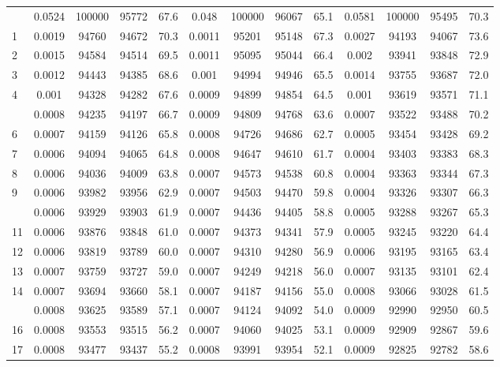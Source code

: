 \documentclass[
  14pt,
]{article}
\begin{document}
\begin{longtable}[t]{lcccccccccccc}
\endfoot
\bottomrule
\endlastfoot
0 & 0.0524 & 100000 & 95772 & 67.6 & 0.048 & 100000 & 96067 & 65.1 & 0.0581 & 100000 & 95495 & 70.3\\
1 & 0.0019 & 94760 & 94672 & 70.3 & 0.0011 & 95201 & 95148 & 67.3 & 0.0027 & 94193 & 94067 & 73.6\\
2 & 0.0015 & 94584 & 94514 & 69.5 & 0.0011 & 95095 & 95044 & 66.4 & 0.002 & 93941 & 93848 & 72.9\\
3 & 0.0012 & 94443 & 94385 & 68.6 & 0.001 & 94994 & 94946 & 65.5 & 0.0014 & 93755 & 93687 & 72.0\\
4 & 0.001 & 94328 & 94282 & 67.6 & 0.0009 & 94899 & 94854 & 64.5 & 0.001 & 93619 & 93571 & 71.1\\
\addlinespace
5 & 0.0008 & 94235 & 94197 & 66.7 & 0.0009 & 94809 & 94768 & 63.6 & 0.0007 & 93522 & 93488 & 70.2\\
6 & 0.0007 & 94159 & 94126 & 65.8 & 0.0008 & 94726 & 94686 & 62.7 & 0.0005 & 93454 & 93428 & 69.2\\
7 & 0.0006 & 94094 & 94065 & 64.8 & 0.0008 & 94647 & 94610 & 61.7 & 0.0004 & 93403 & 93383 & 68.3\\
8 & 0.0006 & 94036 & 94009 & 63.8 & 0.0007 & 94573 & 94538 & 60.8 & 0.0004 & 93363 & 93344 & 67.3\\
9 & 0.0006 & 93982 & 93956 & 62.9 & 0.0007 & 94503 & 94470 & 59.8 & 0.0004 & 93326 & 93307 & 66.3\\
\addlinespace
10 & 0.0006 & 93929 & 93903 & 61.9 & 0.0007 & 94436 & 94405 & 58.8 & 0.0005 & 93288 & 93267 & 65.3\\
11 & 0.0006 & 93876 & 93848 & 61.0 & 0.0007 & 94373 & 94341 & 57.9 & 0.0005 & 93245 & 93220 & 64.4\\
12 & 0.0006 & 93819 & 93789 & 60.0 & 0.0007 & 94310 & 94280 & 56.9 & 0.0006 & 93195 & 93165 & 63.4\\
13 & 0.0007 & 93759 & 93727 & 59.0 & 0.0007 & 94249 & 94218 & 56.0 & 0.0007 & 93135 & 93101 & 62.4\\
14 & 0.0007 & 93694 & 93660 & 58.1 & 0.0007 & 94187 & 94156 & 55.0 & 0.0008 & 93066 & 93028 & 61.5\\
\addlinespace
15 & 0.0008 & 93625 & 93589 & 57.1 & 0.0007 & 94124 & 94092 & 54.0 & 0.0009 & 92990 & 92950 & 60.5\\
16 & 0.0008 & 93553 & 93515 & 56.2 & 0.0007 & 94060 & 94025 & 53.1 & 0.0009 & 92909 & 92867 & 59.6\\
17 & 0.0008 & 93477 & 93437 & 55.2 & 0.0008 & 93991 & 93954 & 52.1 & 0.0009 & 92825 & 92782 & 58.6\\

\end{longtable}
\end{document}

